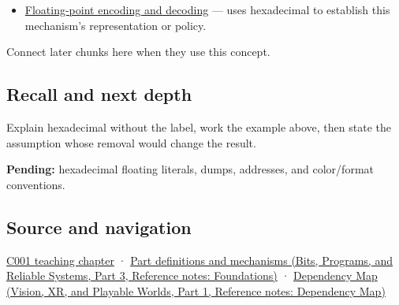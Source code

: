 \hypertarget{appendix-6b8075763724-used-by}{}

\begin{itemize}
\tightlist
\item
  \hyperref[appendix-6854d0e2218e]{Floating-point encoding and decoding} --- uses hexadecimal to establish this mechanism's representation or policy.
\end{itemize}

Connect later chunks here when they use this concept.

\subsection{Recall and next depth}\label{appendix-6b8075763724-recall-and-next-depth}

\hypertarget{appendix-6b8075763724-recall-and-next-depth}{}

Explain hexadecimal without the label, work the example above, then state the assumption whose removal would change the result.

\textbf{Pending:} hexadecimal floating literals, dumps, addresses, and color/format conventions.

\subsection{Source and navigation}\label{appendix-6b8075763724-source-and-navigation}

\hypertarget{appendix-6b8075763724-source-and-navigation}{}

\hyperref[01-foundations-i-ch001-from-a-signal-to-an-interpretation]{C001 teaching chapter} · \href{../01-Bits-Programs-and-Reliable-Systems-P03/main.pdf\#appendix-fd090d982a15}{Part definitions and mechanisms (Bits, Programs, and Reliable Systems, Part 3, Reference notes: Foundations)} · \href{../07-Vision-XR-and-Playable-Worlds-P01/main.pdf\#appendix-4ad47bdd269a}{Dependency Map (Vision, XR, and Playable Worlds, Part 1, Reference notes: Dependency Map)}

